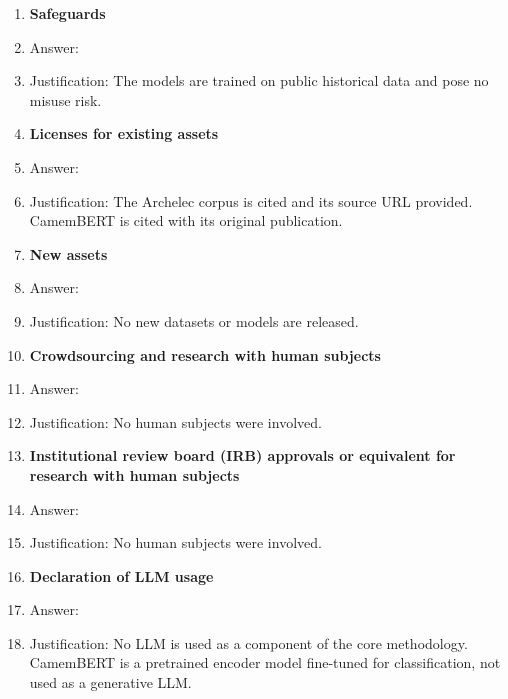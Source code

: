 \begin{enumerate}
\item {\bf Safeguards}
    \item[] Answer: \answerNA{}
    \item[] Justification: The models are trained on public historical data and pose no misuse risk.

\item {\bf Licenses for existing assets}
    \item[] Answer: \answerYes{}
    \item[] Justification: The Archelec corpus is cited and its source URL provided. CamemBERT is cited with its original publication.

\item {\bf New assets}
    \item[] Answer: \answerNA{}
    \item[] Justification: No new datasets or models are released.

\item {\bf Crowdsourcing and research with human subjects}
    \item[] Answer: \answerNA{}
    \item[] Justification: No human subjects were involved.

\item {\bf Institutional review board (IRB) approvals or equivalent for research with human subjects}
    \item[] Answer: \answerNA{}
    \item[] Justification: No human subjects were involved.

\item {\bf Declaration of LLM usage}
    \item[] Answer: \answerNA{}
    \item[] Justification: No LLM is used as a component of the core methodology. CamemBERT is a pretrained encoder model fine-tuned for classification, not used as a generative LLM.

\end{enumerate}
